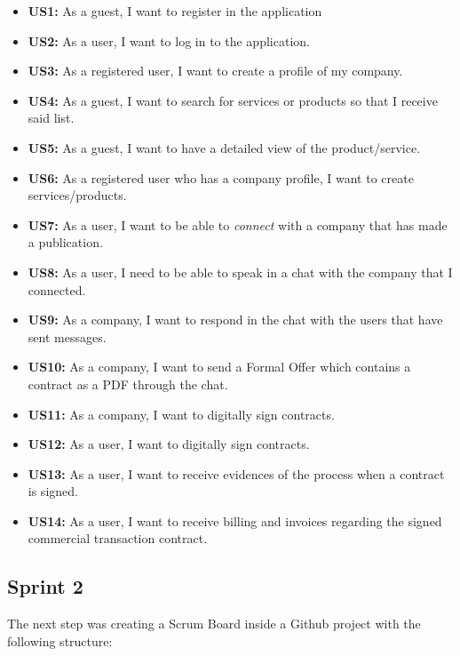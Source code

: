 \documentclass[./main.tex]{subfiles}
\begin{document}
\begin{itemize}

\item
  \textbf{US1:} As a guest, I want to register in the application
\item
  \textbf{US2:} As a user, I want to log in to the application.
\item
  \textbf{US3:} As a registered user, I want to create a profile of my
  company.
\item
  \textbf{US4:} As a guest, I want to search for services or products so
  that I receive said list.
\item
  \textbf{US5:} As a guest, I want to have a detailed view of the
  product/service.
\item
  \textbf{US6:} As a registered user who has a company profile, I want
  to create services/products.
\item
  \textbf{US7:} As a user, I want to be able to \emph{connect} with a
  company that has made a publication.
\item
  \textbf{US8:} As a user, I need to be able to speak in a chat with the
  company that I connected.
\item
  \textbf{US9:} As a company, I want to respond in the chat with the
  users that have sent messages.
\item
  \textbf{US10:} As a company, I want to send a Formal Offer which
  contains a contract as a PDF through the chat.
\item
  \textbf{US11:} As a company, I want to digitally sign contracts.
\item
  \textbf{US12:} As a user, I want to digitally sign contracts.
\item
  \textbf{US13:} As a user, I want to receive evidences of the process
  when a contract is signed.
\item
  \textbf{US14:} As a user, I want to receive billing and invoices
  regarding the signed commercial transaction contract.
  
\end{itemize}


\subsection{Sprint 2}

The next step was creating a Scrum Board inside a Github project with
the following structure:
\end{document}
